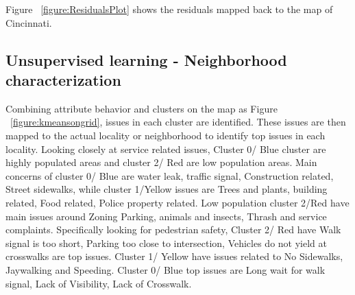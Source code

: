 \documentclass{llncs}
\begin{document}
Figure ~\ref{figure:ResidualsPlot} shows the residuals mapped back to the map of Cincinnati.

\subsection{Unsupervised learning - Neighborhood characterization}


Combining attribute behavior and clusters on the map as Figure ~\ref{figure:kmeansongrid}, issues in each cluster are identified. These issues are then mapped to the actual locality or neighborhood to identify top issues in each locality. 
Looking closely at service related issues, Cluster 0/ Blue cluster are highly populated areas and cluster 2/ Red are low population areas. Main concerns of cluster 0/ Blue are water leak, traffic signal, Construction related, Street sidewalks, while cluster 1/Yellow issues are Trees and plants, building related, Food related, Police property related. Low population cluster 2/Red have main issues around  Zoning Parking, animals and insects, Thrash and service complaints. 
Specifically looking for pedestrian safety, Cluster 2/ Red have Walk signal is too short, Parking too close to intersection, Vehicles do not yield at crosswalks are top issues. Cluster 1/ Yellow have issues related to No Sidewalks, Jaywalking and Speeding. Cluster 0/ Blue top issues are Long wait for walk signal, Lack of Visibility, Lack of Crosswalk.
\end{document}
